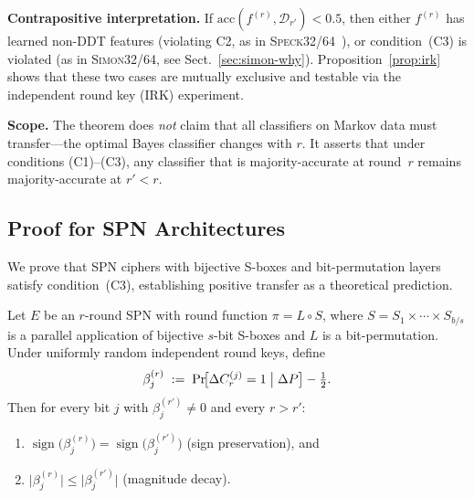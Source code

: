 \documentclass[runningheads]{llncs}
\newcommand{\speck}{\textsc{Speck32/64}}
\newcommand{\simon}{\textsc{Simon32/64}}
\begin{document}
\textbf{Contrapositive interpretation.}
If $\mathrm{acc}(f^{(r)}, \mathcal{D}_{r'}) < 0.5$, then either $f^{(r)}$ has learned non-DDT features (violating C2, as in \speck~\cite{gohr2022assessment}), or condition~(C3) is violated (as in \simon, see Sect.~\ref{sec:simon-why}).
Proposition~\ref{prop:irk} shows that these two cases are mutually exclusive and testable via the independent round key (IRK) experiment.

\textbf{Scope.}
The theorem does \emph{not} claim that all classifiers on Markov data must transfer---the optimal Bayes classifier changes with $r$.
It asserts that under conditions (C1)--(C3), any classifier that is majority-accurate at round~$r$ remains majority-accurate at $r' < r$.

\subsection{Proof for SPN Architectures}

We prove that SPN ciphers with bijective S-boxes and bit-permutation layers satisfy condition~(C3), establishing positive transfer as a theoretical prediction.

\begin{proposition}
\label{prop:c3-spn}
Let $E$ be an $r$-round SPN with round function $\pi = L \circ S$, where
$S = S_1 \times \cdots \times S_{b/s}$ is a parallel application of
bijective $s$-bit S-boxes and $L$ is a bit-permutation.
Under uniformly random independent round keys, define
\[
  \beta_j^{(r)}
  \;:=\;
  \Pr\!\bigl[\Delta C_r^{(j)} = 1 \bigm| \Delta P\bigr]
  - \tfrac{1}{2}.
\]
Then for every bit $j$ with $\beta_j^{(r')} \neq 0$ and every $r > r'$:
\begin{enumerate}[label=\textup{(\alph*)},itemsep=2pt]
  \item $\operatorname{sign}\!\bigl(\beta_j^{(r)}\bigr)
        = \operatorname{sign}\!\bigl(\beta_j^{(r')}\bigr)$
        \quad\textup{(sign preservation)}, and
  \item $\bigl|\beta_j^{(r)}\bigr|
        \leq \bigl|\beta_j^{(r')}\bigr|$
        \quad\textup{(magnitude decay)}.
\end{enumerate}
\end{proposition}
\end{document}
